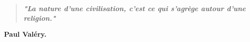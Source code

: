 \documentclass[20pt, twoside, openany]{extbook}
\begin{document}
\thispagestyle{empty}

\clearpage

\thispagestyle{empty}

\begin{center}
\begin{quote}
\textbf{\textit{"La nature d'une civilisation, c'est ce qui s'agrège autour d'une religion."}}
\end{quote} 
\vfill\textbf{Paul Valéry.}
\end{center}

\renewcommand{\contentsname}{Sommaire}
\tableofcontents








\end{document}
